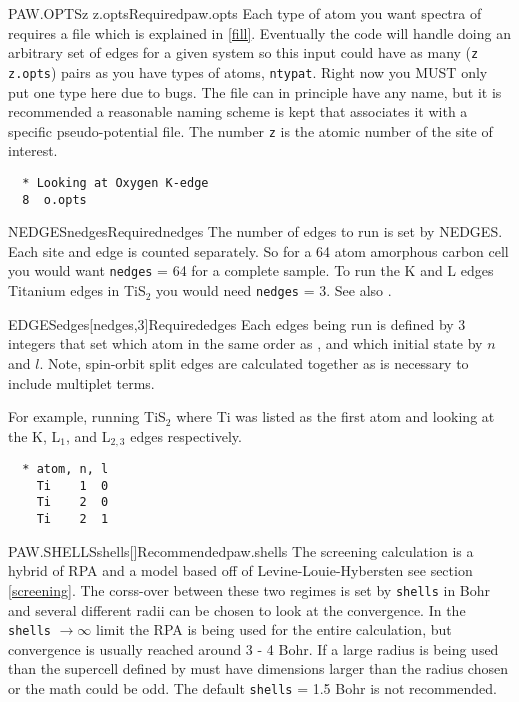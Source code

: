 \documentclass[11pt]{report}
\begin{document}
\begin{Card}{PAW.OPTS}{z z.opts}{Required}{paw.opts}
Each type of atom you want spectra of requires a  file which is explained in \ref{fill}. Eventually the code will handle doing an arbitrary set of edges for a given system so this input could have as many (\texttt{z} \texttt{z.opts}) pairs as you have types of atoms, \texttt{ntypat}. Right now you MUST only put one type here due to bugs. The file  can in principle have any name, but it is recommended a reasonable naming scheme is kept that associates it with a specific pseudo-potential file. The number \texttt{z} is the atomic number of the site of interest.

\begin{verbatim}
  * Looking at Oxygen K-edge
  8  o.opts
\end{verbatim}
\end{Card}

\begin{Card}{NEDGES}{nedges}{Required}{nedges}
The number of edges to run is set by NEDGES. Each site and edge is counted separately. So for a 64 atom amorphous carbon cell you would want \texttt{nedges} = 64 for a complete sample. To run the K and L edges Titanium edges in TiS$_2$ you would need \texttt{nedges} = 3. See also .
\end{Card}

\begin{Card}{EDGES}{edges[nedges,3]}{Required}{edges}
Each edges being run is defined by 3 integers that set which atom in the same order as , and which initial state by $n$ and $l$. Note, spin-orbit split edges are calculated together as is necessary to include multiplet terms.

For example, running TiS$_2$ where Ti was listed as the first atom and looking at the K, L$_1$, and L$_{2,3}$ edges respectively.
\begin{verbatim}
  * atom, n, l
    Ti    1  0
    Ti    2  0
    Ti    2  1
\end{verbatim}
\end{Card}

\begin{Card}{PAW.SHELLS}{shells[]}{Recommended}{paw.shells}
The screening calculation is a hybrid of RPA and a model based off of Levine-Louie-Hybersten see section \ref{screening}. The corss-over between these two regimes is set by \texttt{shells} in Bohr and several different radii can be chosen to look at the convergence. In the \texttt{shells} $\rightarrow \infty$ limit the RPA is being used for the entire calculation, but convergence is usually reached around 3 - 4 Bohr. If a large radius is being used than the supercell defined by  must have dimensions larger than the radius chosen or the math could be odd. The default \texttt{shells} = 1.5 Bohr is not recommended.
\end{Card}
\end{document}
